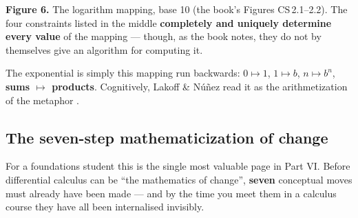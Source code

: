 \vspace{-3pt}
\begin{center}\begin{minipage}{0.93\textwidth}\footnotesize\color{slate}
\textbf{Figure 6.}\; The logarithm mapping, base 10  (the book's Figures
CS\,2.1--2.2). The four constraints listed in the middle \textbf{completely and uniquely determine
every value} of the mapping --- though, as the book notes, they do not by themselves give an
algorithm for computing it.
\end{minipage}\end{center}

\noindent The exponential is simply this mapping run backwards: $0\mapsto1$, $1\mapsto b$,
$n\mapsto b^n$, \textbf{sums $\mapsto$ products}. Cognitively, Lakoff \& Núñez read it as the
arithmetization of the metaphor  .

\clearpage
\subsection{The seven-step mathematicization of change}

For a foundations student this is the single most valuable page in Part VI. Before differential
calculus can be ``the mathematics of change'', \textbf{seven} conceptual moves must already have been
made --- and by the time you meet them in a calculus course they have all been internalised
invisibly.

